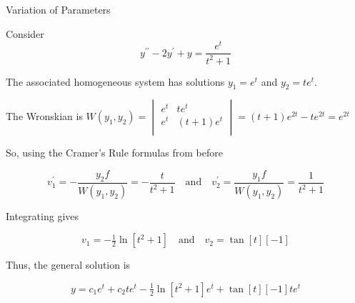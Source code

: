 \documentclass{beamer}
\begin{document}
\begin{frame}{Variation of Parameters}
\begin{example}
Consider
\begin{equation*}
y^{\prime\prime}-2y^\prime+y=\dfrac{e^t}{t^2+1}
\end{equation*}\pause

\vspace{-3mm}
The associated homogeneous system has solutions $y_1=e^t$ and $y_2=te^t$.\pause

\vspace{2mm}
The Wronskian is $W(y_1,y_2)=
\begin{vmatrix}
e^t & te^t     \\
e^t & (t+1)e^t \\
\end{vmatrix}
=(t+1)e^{2t}-te^{2t}=e^{2t}$\pause

\vspace{2mm}
So, using the Cramer's Rule formulas from before

\vspace{-2mm}
\begin{equation*}
v_1^\prime=-\dfrac{y_2 f}{W(y_1,y_2)}=-\dfrac{t}{t^2+1}
\quad\text{and}\quad
v_2^\prime=\dfrac{y_1 f}{W(y_1,y_2)}=\dfrac{1}{t^2+1}
\end{equation*}\pause

\vspace{-4mm}
Integrating gives

\vspace{-4mm}
\begin{equation*}
v_1=-\tfrac{1}{2}\ln[t^2+1]
\quad\text{and}\quad
v_2=\tan[t][-1]
\end{equation*}\pause

\vspace{-6mm}
Thus, the general solution is

\vspace{-4mm}
\begin{equation*}
y=c_1e^t+c_2te^t-\tfrac{1}{2}\ln[t^2+1]e^t+\tan[t][-1]te^t
\end{equation*}
\end{example}
\end{frame}
\end{document}
